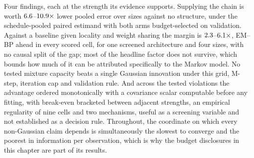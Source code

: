 Four findings, each at the strength its evidence supports. Supplying the
chain is worth $6.6$--$10.9\times$ lower pooled error over
\nsizesused{} sizes against no structure, under the schedule-pooled paired
estimand with both arms budget-selected on validation. Against a baseline
given locality and weight sharing the margin is
$2.3$--$6.1\times$, EM--BP ahead in every scored cell,
for one screened architecture and four sizes, with no causal split of the
gap; most of the headline factor does not survive, which bounds how much of
it can be attributed specifically to the Markov model. No tested mixture
capacity beats a single Gaussian innovation under this grid, M-step,
iteration cap and validation rule. And across the tested violations the
advantage ordered monotonically with a covariance scalar computable before
any fitting, with break-even bracketed between adjacent strengths, an
empirical regularity of nine cells and two mechanisms, useful as a screening
variable and not established as a decision rule. Throughout, the coordinate
on which every non-Gaussian claim depends is simultaneously the slowest to
converge and the poorest in information per observation, which is why the
budget disclosures in this chapter are part of its results.
